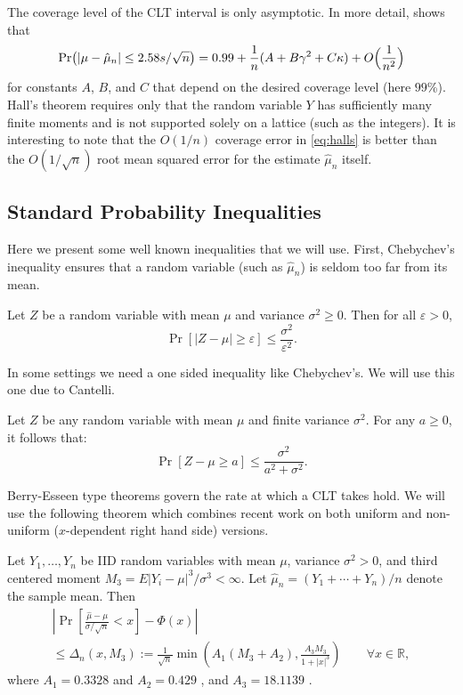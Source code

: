 \documentclass[graybox]{svmult}
\newcommand\reals{\mathbb{R}}
\newcommand{\Prob}{\Pr}
\newcommand{\abs}[1]{\left|#1\right|}
\newcommand{\hmu}{\hat{\mu}}
\def\abs#1{\ensuremath{\left \lvert #1 \right \rvert}}
\begin{document}
The coverage level of the CLT interval is only asymptotic. In
more detail, \cite[p.\ 948]{Hal88a} shows that
\begin{align}\label{eq:halls}
\Pr\bigl(
\abs{\mu - 
\hat\mu_n} \le 2.58 s/\sqrt{n}
\bigr)
= 0.99 + \frac1n(A + B\gamma^2+C\kappa) + O\Bigl(\frac1{n^2}\Bigr)
\end{align}
for constants $A$, $B$, and $C$ that depend
on the desired coverage level (here $99$\%).  Hall's theorem
requires only that the random variable $Y$ has sufficiently
many finite moments
and is not supported solely on a lattice (such as
the integers).
It is interesting to note that the $O(1/n)$ coverage error in
\eqref{eq:halls} is better than the $O(1/\sqrt{n})$
root mean squared error for the estimate $\hat\mu_n$ itself.


\subsection{Standard Probability Inequalities}

Here we present some well known inequalities
that we will use.
First, Chebychev's inequality ensures that
a random variable (such as $\hat\mu_n$) is
seldom too far from its mean.

\begin{theorem} \citep[6.1c, p.\ 52]{LinBai10a}\label{Chebineqthm} Let $Z$ be a random variable with mean $\mu$ and variance $\sigma^2 \ge 0$.  
Then for all $\varepsilon >0$,
\[
\Prob[\abs{Z-\mu} \ge \varepsilon ] \le \frac{\sigma^2}{\varepsilon^2}.
\]
\end{theorem}


In some settings we need a one sided inequality
like Chebychev's. We will use this one due to Cantelli.

\begin{theorem} \citep[6.1e, p.\ 53]{LinBai10a} \label{Can}
Let $Z$ be any random variable with mean $\mu$ and finite variance $\sigma^2$.  For any $a\geq 0$, it
follows that:
\[
\Prob[Z-\mu \geq a]\leq \frac{\sigma^2}{a^2+\sigma^2}.
\]
\end{theorem}

Berry-Esseen type theorems govern the rate at which
a CLT takes hold. We will use the following theorem which combines recent work on both uniform and non-uniform ($x$-dependent right hand side) versions.

\begin{theorem} \label{BE} Let $Y_1,\dots,Y_n$ be IID random variables with mean
$\mu$, variance $\sigma^2>0$, and third centered moment $M_3=E\abs{Y_i - \mu}^3/\sigma^3 < \infty$.  Let $\hmu_n=(Y_1 +\cdots + Y_n)/n$ denote the sample mean.
Then
\begin{multline*}
\abs{\Prob\left[\frac{\hmu-\mu}{\sigma/\sqrt{n}} <x
\right]-\Phi(x)} \\
\leq \Delta_n(x,M_3) := \frac{1}{\sqrt{n}} \min\left(A_1(M_3+A_2), \frac{A_3 M_3}{1+\abs{x}^{3}} \right) \qquad \forall x \in \reals,
\end{multline*}
where $A_1=0.3328$ and $A_2=0.429$ \citep{She11a}, and $A_3=18.1139$ \citep{NefShe12a}.
\end{theorem}
\end{document}
